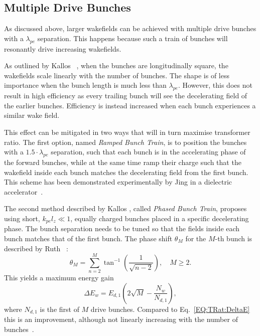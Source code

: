 \subsection{Multiple Drive Bunches}
\label{Int:BPI:Multi}

As discussed above, larger wakefields can be achieved with multiple drive bunches with a $\lambda_{pe}$ separation.
This happens because such a train of bunches will resonantly drive increasing wakefields.

As outlined by Kallos \etal~\cite{kallos:2007}, when the bunches are longitudinally square, the wakefields scale linearly with the number of bunches.
The shape is of less importance when the bunch length is much less than $\lambda_{pe}$.
However, this does not result in high efficiency as every trailing bunch will see the decelerating field of the earlier bunches.
Efficiency is instead increased when each bunch experiences a similar wake field.

This effect can be mitigated in two ways that will in turn maximise transformer ratio.
The first option, named \textit{Ramped Bunch Train}, is to position the bunches with a $1.5\cdot\lambda_{pe}$ separation, such that each bunch is in the accelerating phase of the forward bunches, while at the same time ramp their charge such that the wakefield inside each bunch matches the decelerating field from the first bunch.
This scheme has been demonstrated experimentally by Jing \etal in a dielectric accelerator~\cite{jing:2006,jing:2007}.

The second method described by Kallos \etal, called \textit{Phased Bunch Train}, proposes using short, $k_{pe}l_{z} \ll 1$, equally charged bunches placed in a specific decelerating phase.
The bunch separation needs to be tuned so that the fields inside each bunch matches that of the first bunch.
The phase shift $\theta_{M}$ for the $M$-th bunch is described by Ruth \etal~\cite{ruth:1985}:
\begin{equation}
    \theta_{M} = \sum^{M}_{n=2}\tan^{-1}\left(\frac{1}{\sqrt{n-2}}\right),\quad M \geq 2. \label{EQ:TrainPhase}
\end{equation}
This yields a maximum energy gain
\begin{equation}
    \Delta E_{w} = E_{d,1}\left(2\sqrt{M}-\frac{N_{w}}{N_{d,1}}\right), \label{EQ:TrainPhaseMaxE}
\end{equation}
where $N_{d,1}$ is the first of $M$ drive bunches.
Compared to Eq.~\ref{EQ:TRat:DeltaE} this is an improvement, although not linearly increasing with the number of bunches~\cite{ruth:1985}.

